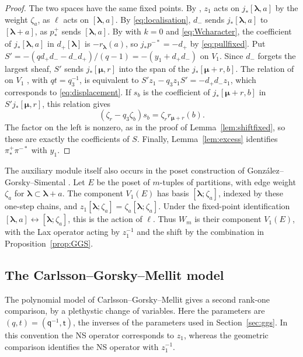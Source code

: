 \documentclass[11pt]{amsart}
\theoremstyle{definition}
\theoremstyle{remark}
\newcommand{\Mq}{\mathsf q}                      %
\newcommand{\Mt}{\mathsf t}                      %
\newcommand{\bl}{{\boldsymbol{\lambda}}}         %
\newcommand{\bmu}{{\boldsymbol{\mu}}}
\newcommand{\bwt}[1]{\zeta_{#1}}                 %
\newcommand{\res}[2]{r_{#1}(#2)}                 %
\newcommand{\Wsp}[1]{W_{#1}}                     %
\newcommand{\fix}[1]{[#1]}                       %
\newcommand{\pt}[2]{[#1,#2]}                     %
\newcommand{\taut}{\ell}                         %
\newcommand{\pulm}{p^{-*}}                       %
\newcommand{\pushp}{p^+_*}                       %
\newcommand{\pimpull}{\pi^{-*}}                  %
\newcommand{\pippush}{\pi^+_*}                   %
\newcommand{\incl}{j}                            %
\newcommand{\Shift}{S}                           %
\newcommand{\zz}[1]{z_{#1}}
\newcommand{\yy}[1]{y_{#1}}
\newcommand{\zone}{\zz{1}}
\newcommand{\yone}{\yy{1}}
\newcommand{\dplus}{d_+}
\newcommand{\dminus}{d_-}
\begin{document}
\begin{proof}
The two spaces have the same fixed points. By \cite[(3.8) and Theorem~6.21]{GGS}, \(\zone\) acts on
\(\incl_*\pt{\bl}{a}\) by the weight \(\bwt{a}\), as \(\taut\) acts on \(\pt{\bl}{a}\). By \eqref{eq:localisation},
\(\dminus\) sends \(\incl_*\pt{\bl}{a}\) to \(\fix{\bl+a}\), as \(\pushp\) sends \(\pt{\bl}{a}\). By \cite[Lemma~5.8]{GGS} with \(k=0\)
and \eqref{eq:Wcharacter}, the coefficient of \(\incl_*\pt{\bl}{a}\) in \(\dplus\fix{\bl}\) is \(-\res{\bl}{a}\), so
\(\incl_*\pulm=-\dplus\) by \eqref{eq:pullfixed}. Put \(S'=-(q\dplus\dminus-\dminus\dplus)/(q-1)=-(\yone+\dplus\dminus)\)
on \(V_1\). Since \(\dminus\) forgets the largest sheaf, \(S'\) sends \(\incl_*\pt{\bmu}{r}\) into the span of the
\(\incl_*\pt{\bmu+r}{b}\). The relation of \cite{GGS} on \(V_1\) \cite[(2.8) and Lemma~3.22]{GGS}, with
\(qt=q_3^{-1}\), is equivalent to \(S'\zone-q_3\zone S'=-\dplus\dminus\zone\), which corresponds to
\eqref{eq:displacement}. If \(s_b\) is the coefficient of
\(\incl_*\pt{\bmu+r}{b}\) in \(S'\incl_*\pt{\bmu}{r}\), this relation gives
\[
 (\bwt{r}-q_3\bwt{b})s_b=\bwt{r}\res{\bmu+r}{b}.
\]
The factor on the left is nonzero, as in the proof of Lemma~\ref{lem:shiftfixed},
so these are exactly the coefficients of \(\Shift\).
Finally, Lemma~\ref{lem:excess} identifies \(\pippush\pimpull\) with \(\yone\).
\end{proof}

The auxiliary module itself also occurs in the poset construction of
Gonz\'alez--Gorsky--Simental \cite[Definition~3.20 and Theorem~6.21]{GGS}.
Let \(E\) be the poset of \(m\)-tuples of partitions, with edge weight \(\bwt{a}\)
for \(\bl\subset\bl+a\). The component \(V_1(E)\) has basis
\([\bl;\bwt{a}]\), indexed by these one-step chains, and
\(\zone[\bl;\bwt{a}]=\bwt{a}[\bl;\bwt{a}]\).
Under the fixed-point identification
\(\pt{\bl}{a}\leftrightarrow[\bl;\bwt{a}]\), this is the action of \(\taut\).
Thus \(\Wsp{m}\) is their component \(V_1(E)\), with the Lax operator acting by
\(\zone^{-1}\) and the shift by the combination in Proposition~\ref{prop:GGS}.

\subsection{The Carlsson--Gorsky--Mellit model}\label{sec:cgm}

The polynomial model of Carlsson--Gorsky--Mellit \cite{CGM} gives a second
rank-one comparison, by a plethystic change of variables. Here the parameters
are \((q,t)=(\Mq^{-1},\Mt)\), the inverses of the parameters used in
Section~\ref{sec:ggs}. In this convention the NS operator corresponds to
\(\zone\), whereas the geometric comparison identifies the NS operator with \(\zone^{-1}\).
\end{document}
